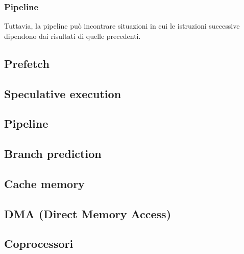\begin{frame}
	\frametitle{ Pipeline}

		Tuttavia, la pipeline può incontrare situazioni in cui le istruzioni successive dipendono dai risultati di quelle precedenti.
		

\end{frame}






\subsection[Prefetch]{Prefetch}
\subsection[Speculative execution]{Speculative execution}
\subsection[Pipeline]{Pipeline}
\subsection[Branch prediction]{Branch prediction}
\subsection[Cache memory]{Cache memory}
\subsection[DMA (Direct Memory Access)]{DMA (Direct Memory Access)}
\subsection[Coprocessori]{Coprocessori}





